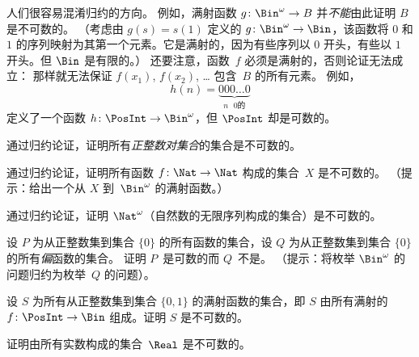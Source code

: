 \documentclass[../../../include/open-logic-section]{subfiles}
\begin{document}
\begin{explain}
人们很容易混淆归约的方向。
例如，满射函数 $g \colon \Bin^\omega \to B$ 并\emph{不能}由此证明 $B$ 是不可数的。
（考虑由 $g(s) = s(1)$ 定义的 $g \colon \Bin^\omega \to \Bin$，该函数将 $0$ 和 $1$ 的序列映射为其第一个元素。它是满射的，因为有些序列以 $0$ 开头，有些以 $1$ 开头。但 $\Bin$ 是有限的。）
还要注意，函数~$f$ 必须是满射的，否则论证无法成立：
那样就无法保证 $f(x_1)$, $f(x_2)$, \dots{} 包含~$B$ 的所有元素。
例如，\[
h(n) = \underbrace{000\dots0}_{\text{$n$ $0$的}}
\]
定义了一个函数 $h\colon \PosInt \to \Bin^\omega$，但 $\PosInt$ 却是可数的。
\end{explain}

\begin{prob}
通过归约论证，证明所有\emph{正整数对集合}的集合是不可数的。
\end{prob}

\begin{prob}\label{sfr:siz:red:prob:nat-nat}
  通过归约论证，证明所有函数 $f\colon \Nat \to \Nat$ 构成的集合~$X$ 是不可数的。
  （提示：给出一个从 $X$ 到~$\Bin^\omega$ 的满射函数。）
\end{prob}

\begin{prob}
通过归约论证，证明 $\Nat^\omega$（自然数的无限序列构成的集合）是不可数的。
\end{prob}

\begin{prob}
设 $P$ 为从正整数集到集合 $\{0\}$ 的所有函数的集合，设 $Q$ 为从正整数集到集合 $\{0\}$ 的所有\emph{偏}函数的集合。
证明 $P$~是可数的而 $Q$~不是。
（提示：将枚举 $\Bin^\omega$ 的问题归约为枚举~$Q$ 的问题）。
\end{prob}

\begin{prob}
设 $S$ 为所有从正整数集到集合 $\{0,1\}$ 的满射函数的集合，即 $S$ 由所有满射的~$f\colon \PosInt \to \Bin$ 组成。证明 $S$ 是不可数的。
\end{prob}

\begin{prob}
证明由所有实数构成的集合~$\Real$ 是不可数的。
\end{prob}
\end{document}
